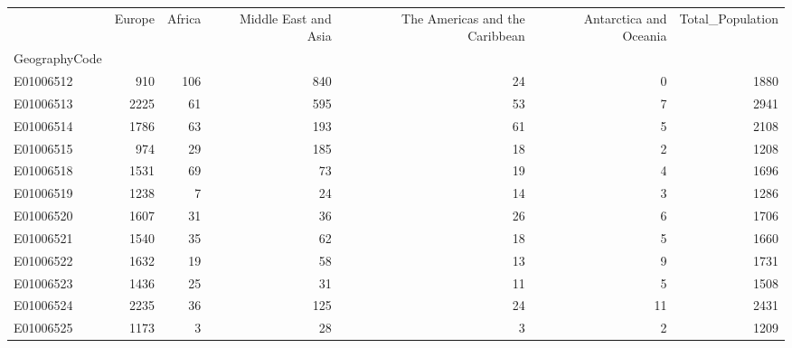 \documentclass[
  letterpaper,
  DIV=11,
  numbers=noendperiod]{scrreprt}
\begin{document}
\begin{tabular}{lrrrrrr}
\toprule
{} &  Europe &  Africa &  Middle East and Asia &  The Americas and the Caribbean &  Antarctica and Oceania &  Total\_Population \\
GeographyCode &         &         &                       &                                 &                         &                   \\
\midrule
E01006512     &     910 &     106 &                   840 &                              24 &                       0 &              1880 \\
E01006513     &    2225 &      61 &                   595 &                              53 &                       7 &              2941 \\
E01006514     &    1786 &      63 &                   193 &                              61 &                       5 &              2108 \\
E01006515     &     974 &      29 &                   185 &                              18 &                       2 &              1208 \\
E01006518     &    1531 &      69 &                    73 &                              19 &                       4 &              1696 \\
E01006519     &    1238 &       7 &                    24 &                              14 &                       3 &              1286 \\
E01006520     &    1607 &      31 &                    36 &                              26 &                       6 &              1706 \\
E01006521     &    1540 &      35 &                    62 &                              18 &                       5 &              1660 \\
E01006522     &    1632 &      19 &                    58 &                              13 &                       9 &              1731 \\
E01006523     &    1436 &      25 &                    31 &                              11 &                       5 &              1508 \\
E01006524     &    2235 &      36 &                   125 &                              24 &                      11 &              2431 \\
E01006525     &    1173 &       3 &                    28 &                               3 &                       2 &              1209 \\

\end{tabular}
\end{document}
